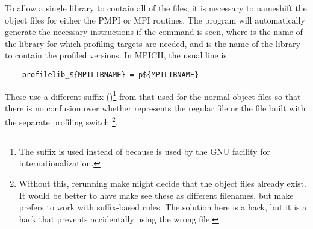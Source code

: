 \documentclass{article}
\begin{document}
To allow a single library to contain all of the files, it is necessary to
nameshift the object files for either the PMPI or MPI routines.  
The  program will automatically generate the
necessary instructions if the command  is
seen, where  is the name of the library for which profiling
targets are needed, and  is the name of the library to
contain the profiled versions.  In MPICH, the usual line is
\begin{verbatim}
    profilelib_${MPILIBNAME} = p${MPILIBNAME}
\end{verbatim}
These use a different suffix ()\footnote{The suffix 
is used instead of  
because  is used by the GNU  facility for
internationalization.}
from that used
for the normal object files so that there is no confusion over whether
 represents the regular file or the file built with the separate
profiling switch \footnote{Without this, rerunning
  make might decide that the object files already exist.  It would be better
  to have make see these as different filenames, but make prefers to work with
  suffix-based rules.  The solution here is a hack, but it is a hack that
  prevents accidentally using the wrong file.}.

%
\end{document}
